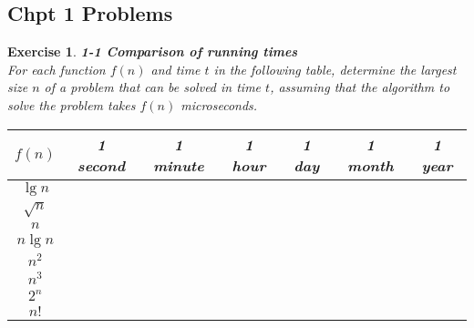 \documentclass[12pt]{article}
\newtheorem{exercise}[theorem]{Exercise}
\theoremstyle{definition}
\begin{document}
\dotfill
\newpage

\subsection*{Chpt 1 Problems}

\begin{exercise}
\noindent
\textbf{1-1 Comparison of running times}\\
\noindent
For each function $f(n)$ and time $t$ in the following table, determine the
largest size $n$ of a problem that can be solved in time $t$, assuming that
the algorithm to solve the problem takes $f(n)$ microseconds.

\begin{center}
\begin{tabular}{|c|c|c|c|c|c|c|}
\hline
$f(n)$ & 1 second & 1 minute & 1 hour & 1 day & 1 month & 1 year \\
\hline
$\lg n$   & & & & & & \\
\hline
$\sqrt{n}$ & & & & & & \\
\hline
$n$       & & & & & & \\
\hline
$n \lg n$ & & & & & & \\
\hline
$n^2$     & & & & & & \\
\hline
$n^3$     & & & & & & \\
\hline
$2^n$     & & & & & & \\
\hline
$n!$      & & & & & & \\
\hline
\end{tabular}
\end{center}
\end{exercise}

\vspace{1pt}
\end{document}
